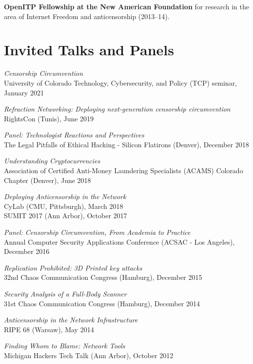 \documentclass[margin,11pt]{res} %
\begin{document}
    \textbf{OpenITP Fellowship at the New American Foundation}
    for research in the area of Internet Freedom and anticensorship (2013--14).

\vspace{6pt}
\section{\large Invited Talks and Panels}

\emph{Censorship Circumvention} \\
    University of Colorado Technology, Cybersecurity, and Policy (TCP) seminar, January 2021

\emph{Refraction Networking: Deploying next-generation censorship circumvention} \\
    RightsCon (Tunis), June 2019

\emph{Panel: Technologist Reactions and Perspectives} \\
    The Legal Pitfalls of Ethical Hacking - Silicon Flatirons (Denver), December 2018

\emph{Understanding Cryptocurrencies} \\
    Association of Certified Anti-Money Laundering Specialists (ACAMS) Colorado Chapter (Denver), June 2018

\emph{Deploying Anticensorship in the Network} \\
    CyLab (CMU, Pittsburgh), March 2018 \\
    SUMIT 2017 (Ann Arbor), October 2017

\emph{Panel: Censorship Circumvention, From Academia to Practice} \\
    Annual Computer Security Applications Conference (ACSAC - Los Angeles), December 2016

\emph{Replication Prohibited: 3D Printed key attacks} \\
    32nd Chaos Communication Congress (Hamburg), December 2015

\emph{Security Analysis of a Full-Body Scanner} \\
    31st Chaos Communication Congress (Hamburg), December 2014

\emph{Anticensorship in the Network Infrastructure} \\
    RIPE 68 (Warsaw), May 2014


\emph{Finding Whom to Blame: Network Tools} \\
    Michigan Hackers Tech Talk (Ann Arbor), October 2012
\end{document}
